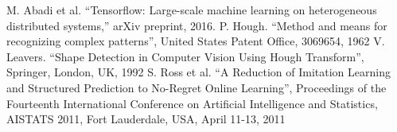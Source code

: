 \documentclass[conference]{IEEEtran}
\begin{document}
\begin{thebibliography}{00}
	
 M. Abadi et al. ``Tensorflow: Large-scale machine learning on heterogeneous distributed systems,'' arXiv preprint, 2016.
 P. Hough. ``Method and means for recognizing complex patterns'', United States Patent Office, 3069654, 1962
 V. Leavers. ``Shape Detection in Computer Vision Using Hough Transform'', Springer, London, UK, 1992
 S. Ross et al. ``A Reduction of Imitation Learning and Structured Prediction to No-Regret Online Learning'', Proceedings of the Fourteenth International Conference on Artificial Intelligence and Statistics, {AISTATS} 2011, Fort Lauderdale, USA, April 11-13, 2011
\end{thebibliography}
\end{document}
